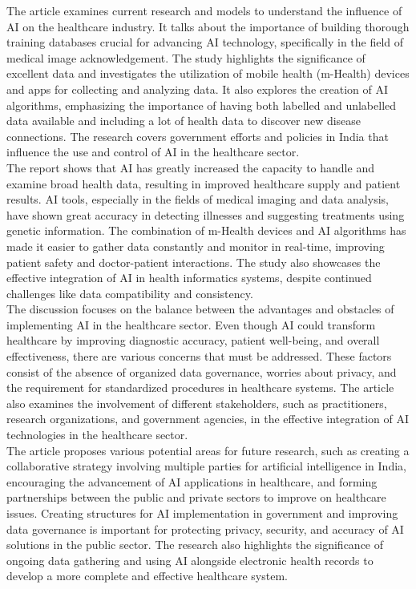 \documentclass[a4paper, 12pt]{article}
\begin{document}
The article examines current research and models to understand the influence of AI on the healthcare industry. It talks about the importance of building thorough training databases crucial for advancing AI technology, specifically in the field of medical image acknowledgement. The study highlights the significance of excellent data and investigates the utilization of mobile health (m-Health) devices and apps for collecting and analyzing data. It also explores the creation of AI algorithms, emphasizing the importance of having both labelled and unlabelled data available and including a lot of health data to discover new disease connections. The research covers government efforts and policies in India that influence the use and control of AI in the healthcare sector.\\

The report shows that AI has greatly increased the capacity to handle and examine broad health data, resulting in improved healthcare supply and patient results. AI tools, especially in the fields of medical imaging and data analysis, have shown great accuracy in detecting illnesses and suggesting treatments using genetic information. The combination of m-Health devices and AI algorithms has made it easier to gather data constantly and monitor in real-time, improving patient safety and doctor-patient interactions. The study also showcases the effective integration of AI in health informatics systems, despite continued challenges like data compatibility and consistency.\\

The discussion focuses on the balance between the advantages and obstacles of implementing AI in the healthcare sector. Even though AI could transform healthcare by improving diagnostic accuracy, patient well-being, and overall effectiveness, there are various concerns that must be addressed. These factors consist of the absence of organized data governance, worries about privacy, and the requirement for standardized procedures in healthcare systems. The article also examines the involvement of different stakeholders, such as practitioners, research organizations, and government agencies, in the effective integration of AI technologies in the healthcare sector.\\

The article proposes various potential areas for future research, such as creating a collaborative strategy involving multiple parties for artificial intelligence in India, encouraging the advancement of AI applications in healthcare, and forming partnerships between the public and private sectors to improve on healthcare issues. Creating structures for AI implementation in government and improving data governance is important for protecting privacy, security, and accuracy of AI solutions in the public sector. The research also highlights the significance of ongoing data gathering and using AI alongside electronic health records to develop a more complete and effective healthcare system.\\
\end{document}
